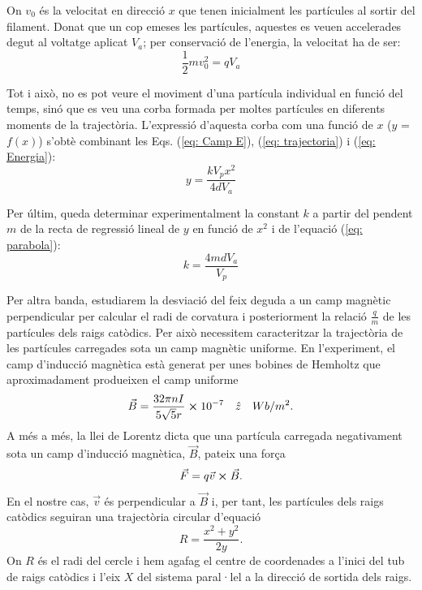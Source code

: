 \documentclass[11pt]{article}
\numberwithin{equation}{section}
\numberwithin{figure}{section}
\numberwithin{table}{section}
\begin{document}
On $v_0$ és la velocitat en direcció $x$ que tenen inicialment les partícules al sortir del filament.
Donat que un cop emeses les partícules, aquestes es veuen accelerades degut al voltatge aplicat $V_a$; per conservació de l'energia, la velocitat ha de ser:
\begin{equation}
    \frac{1}{2}mv_0^2=qV_a
    \label{eq: Energia}
\end{equation}

Tot i això, no es pot veure el moviment d'una partícula individual en funció del temps, sinó que es veu una corba formada per moltes partícules en diferents moments de la trajectòria. L'expressió d'aquesta corba com una funció de $x$ ($y$ = $f(x)$)  s'obtè combinant les Eqs. (\ref{eq: Camp E}), (\ref{eq: trajectoria}) i (\ref{eq: Energia}):
\begin{equation}
    y = \frac{kV_px^2}{4dV_a}
    \label{eq: parabola}
\end{equation}

Per últim, queda determinar experimentalment la constant $k$ a partir del pendent $m$ de la recta de regressió lineal de $y$ en funció de $x^2$ i de l'equació (\ref{eq: parabola}):
 \begin{equation}
      k =\frac{4mdV_a}{V_p}
      \label{eq: k}
 \end{equation}

\vspace{1cm}
Per altra banda, estudiarem la desviació del feix deguda a un camp magnètic perpendicular per calcular el radi de corvatura i posteriorment la relació $\frac{q}{m}$ de les partícules dels raigs catòdics. Per això necessitem caracteritzar la trajectòria de les partícules carregades sota un camp magnètic uniforme. En l'experiment, el camp d'inducció magnètica està generat per unes bobines de Hemholtz que aproximadament produeixen el camp uniforme 
\begin{equation}
    \vec{B}=\frac{32\pi nI}{5\sqrt{5}r}\cross10^{-7} \quad \hat{z}\quad Wb/m^2.
    \label{eq: B}
\end{equation}
A més a més, la llei de Lorentz dicta que una partícula carregada negativament sota un camp d'inducció magnètica, $\vec{B}$, pateix una força
\begin{equation}
    \vec{F}=q\vec{v}\cross\vec{B}.
    \label{eq: Lorentz} 
\end{equation} 
En el nostre cas, $\vec{v}$ és perpendicular a $\vec{B }$ i, per tant, les partícules dels raigs catòdics seguiran una trajectòria circular d'equació
\begin{equation}
    R=\frac{x^2+y^2}{2y}.
    \label{eq: radi}
\end{equation}
On $R$ és el radi del cercle i hem agafag el centre de coordenades a l'inici del tub de raigs catòdics i l'eix $X$ del sistema paral·lel a la direcció de sortida dels raigs.
\end{document}
